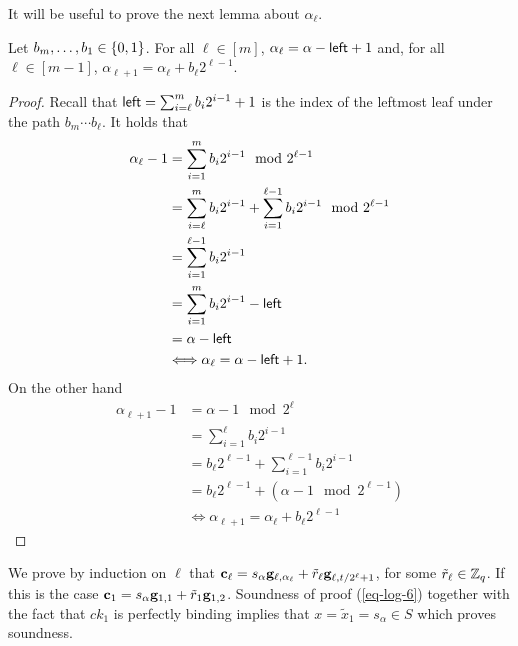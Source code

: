 It will be useful to prove the next lemma about $\alpha_\ell$.
\begin{lemma} Let $b_m,\ldots,b_1\in\{0,1\}$. For all $\ell\in[m]$, $\alpha_\ell = \alpha-{\mathsf{left}}+1$ and, for all $\ell\in[m-1]$, $\alpha_{\ell+1}=\alpha_{\ell}+b_\ell2^{\ell-1}$.
\label{lemma:alpha}
\end{lemma}
\begin{proof}
Recall that ${\mathsf{left}}=\sum_{i=\ell}^m b_i2^{i-1}+1$ is the index of the leftmost leaf under the path $b_m\cdots b_\ell$. It holds that
\begin{align*}
\alpha_\ell-1 &= \sum_{i=1}^m b_i2^{i-1} \mod 2^{\ell-1}\\
              &= \sum_{i=\ell}^m b_i 2^{i-1} + \sum_{i=1}^{\ell-1}b_i2^{i-1} \mod 2^{\ell-1}\\
              &= \sum_{i=1}^{\ell-1}b_i2^{i-1}\\
              &= \sum_{i=1}^m b_i2^{i-1} - {\mathsf{left}}\\
              &= \alpha-{\mathsf{left}}\\
&\Longleftrightarrow \alpha_\ell=\alpha-{\mathsf{left}}+1.
\end{align*}
On the other hand
\begin{align*}
\alpha_{\ell+1}-1 &= \alpha-1 \mod 2^\ell\\
&= \sum_{i=1}^{\ell} b_i2^{i-1}\\
&= b_\ell2^{\ell-1}+\sum_{i=1}^{\ell-1}b_i 2^{i-1}\\
&= b_\ell2^{\ell-1} + (\alpha-1 \mod 2^{\ell-1})\\
&\Longleftrightarrow \alpha_{\ell+1}=\alpha_\ell+b_\ell2^{\ell-1}
\end{align*}
\end{proof}

We prove by induction on \(\ell\) that \(\mathbf{c}_\ell= s_\alpha\mathbf{g}_{\ell,\alpha_\ell}+\tilde{r}_{\ell}\mathbf{g}_{\ell,t /2^\ell+1}\), for some $\tilde{r}_\ell\in\mathbb{Z}_q$. If this is the case $\mathbf{c}_1=s_\alpha\mathbf{g}_{1,1}+\tilde{r}_{1}\mathbf{g}_{1,2}$. Soundness of proof (\ref{eq-log-6}) together with the fact that \(ck_1\) is perfectly binding implies that \(x=\tilde{x}_{1}=s_{\alpha}\in S\) which proves soundness.

